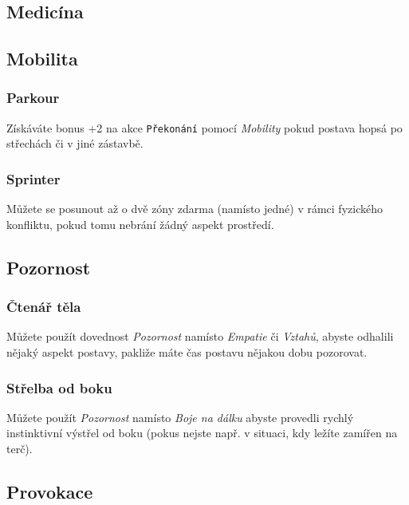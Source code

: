 \subsection{Medicína}
\label{sec:trik-medicina}

\subsection{Mobilita}
\label{sec:trik-mobilita}

\subsubsection{Parkour}
\label{sec:mobilita-parkour}
Získáváte bonus +2 na akce \texttt{Překonání} pomocí \textit{Mobility} pokud postava hopsá po střechách či v jiné zástavbě.

\subsubsection{Sprinter}
\label{sec:mobilita-sprinter}
Můžete se posunout až o dvě zóny zdarma (namísto jedné) v rámci fyzického konfliktu, pokud tomu nebrání žádný aspekt prostředí.

\subsection{Pozornost}
\label{sec:trik-pozornost}

\subsubsection{Čtenář těla}
\label{sec:pozornost-ctenar}

Můžete použít dovednost \textit{Pozornost} namísto \textit{Empatie} či \textit{Vztahů}, abyste odhalili nějaký aspekt postavy, pakliže máte čas postavu nějakou dobu pozorovat.

\subsubsection{Střelba od boku}
\label{sec:pozornost-strelba}
Můžete použít \textit{Pozornost} namísto \textit{Boje na dálku} abyste provedli rychlý instinktivní výstřel od boku (pokus nejste např. v situaci, kdy ležíte zamířen na terč).

\subsection{Provokace}
\label{sec:trik-provokace}

